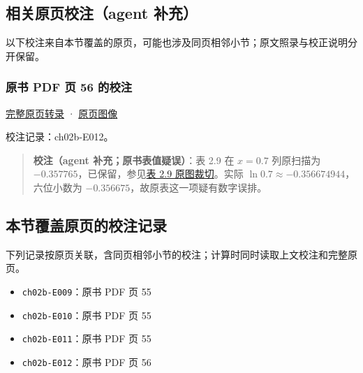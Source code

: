 \documentclass[
  10pt,
  fontset=fandol]{ctexart}
\providecommand{\tightlist}{%
  \setlength{\itemsep}{0pt}\setlength{\parskip}{0pt}}
\begin{document}
\subsection{相关原页校注（agent 补充）}\label{ux76f8ux5173ux539fux9875ux6821ux6ce8agent-ux8865ux5145}

以下校注来自本节覆盖的原页，可能也涉及同页相邻小节；原文照录与校正说明分开保留。

\subsubsection{原书 PDF 页 56 的校注}\label{ux539fux4e66-pdf-ux9875-56-ux7684ux6821ux6ce8}

\href{../pages/pdf-056.md}{完整原页转录} · \href{../../source-images/pdf-056.jpeg}{原页图像}

校注记录：ch02b-E012。

\begin{quote}
\textbf{校注（agent 补充；原书表值疑误）}：表 2.9 在 \(x=0.7\) 列原扫描为 \(-0.357765\)，已保留，参见\href{../assets/ch02b/table-2-9.png}{表 2.9 原图裁切}。实际 \(\ln0.7\approx-0.356674944\)，六位小数为 \(-0.356675\)，故原表这一项疑有数字误排。
\end{quote}

\subsection{本节覆盖原页的校注记录}\label{ux672cux8282ux8986ux76d6ux539fux9875ux7684ux6821ux6ce8ux8bb0ux5f55}

下列记录按原页关联，含同页相邻小节的校注；计算时同时读取上文校注和完整原页。

\begin{itemize}
\tightlist
\item
  \texttt{ch02b-E009}：原书 PDF 页 55
\item
  \texttt{ch02b-E010}：原书 PDF 页 55
\item
  \texttt{ch02b-E011}：原书 PDF 页 55
\item
  \texttt{ch02b-E012}：原书 PDF 页 56
\end{itemize}
\end{document}
